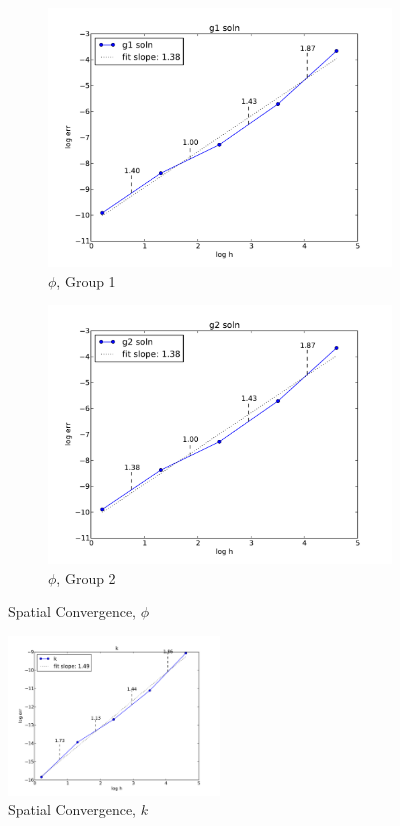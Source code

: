 \documentclass[11pt]{article}
\begin{document}
\begin{figure}[H]
\centering
  \begin{subfigure}[b]{0.45 \textwidth}
   \includegraphics[width=\textwidth]{g1}
   \caption{$\phi$, Group 1}
   \label{g1}
  \end{subfigure}
  \begin{subfigure}[b]{0.45 \textwidth}
   \includegraphics[width=\textwidth]{g2}
   \caption{$\phi$, Group 2}
   \label{g2}
  \end{subfigure}
  \caption{Spatial Convergence, $\phi$}
  \label{spatialphi}
\end{figure}
\begin{figure}[H]
\centering
   \includegraphics[width=0.5\textwidth]{k}
   \caption{Spatial Convergence, $k$}
   \label{spatialk}
\end{figure}
\end{document}
